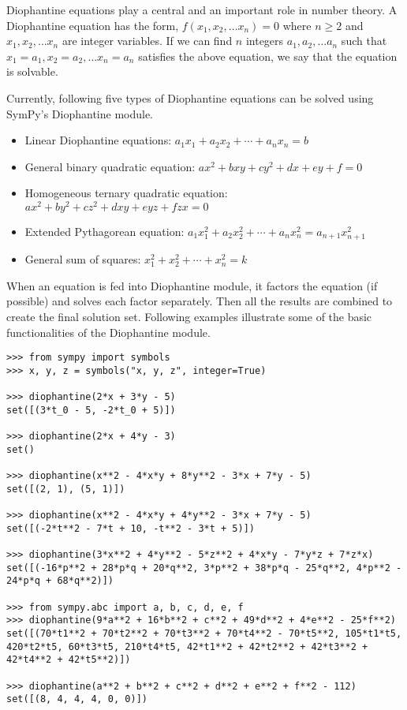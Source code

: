 Diophantine equations play a central and an important role in number theory.
A Diophantine equation has the form, $f(x_1, x_2, \ldots x_n) = 0$
where $n \geq 2$ and $x_1, x_2, \ldots x_n$ are integer variables. If we can find
$n$ integers $a_1, a_2, \ldots a_n$ such that $x_1 = a_1, x_2 = a_2, \ldots x_n = a_n$
satisfies the above equation, we say that the equation is solvable.

Currently, following five types of Diophantine equations can be solved using
SymPy's Diophantine module.

\begin{itemize}
    \item Linear Diophantine equations: $a_1x_1 + a_2x_2 + \cdots + a_{n}x_{n} = b$
    \item General binary quadratic equation: $ax^2 + bxy + cy^2 + dx + ey + f = 0$
    \item Homogeneous ternary quadratic equation: $ax^2 + by^2 + cz^2 + dxy + eyz + fzx = 0$
    \item Extended Pythagorean equation: $a_{1}x_{1}^2 + a_{2}x_{2}^2 + \cdots + a_{n}x_{n}^2 = a_{n+1}x_{n+1}^2$
    \item General sum of squares: $x_{1}^2 + x_{2}^2 + \cdots + x_{n}^2 = k$
\end{itemize}

When an equation is fed into Diophantine module, it factors the equation (if
possible) and solves each factor separately. Then all the results are combined to
create the final solution set. Following examples illustrate some of the basic
functionalities of the Diophantine module.

\begin{verbatim}
>>> from sympy import symbols
>>> x, y, z = symbols("x, y, z", integer=True)

>>> diophantine(2*x + 3*y - 5)
set([(3*t_0 - 5, -2*t_0 + 5)])

>>> diophantine(2*x + 4*y - 3)
set()

>>> diophantine(x**2 - 4*x*y + 8*y**2 - 3*x + 7*y - 5)
set([(2, 1), (5, 1)])

>>> diophantine(x**2 - 4*x*y + 4*y**2 - 3*x + 7*y - 5)
set([(-2*t**2 - 7*t + 10, -t**2 - 3*t + 5)])

>>> diophantine(3*x**2 + 4*y**2 - 5*z**2 + 4*x*y - 7*y*z + 7*z*x)
set([(-16*p**2 + 28*p*q + 20*q**2, 3*p**2 + 38*p*q - 25*q**2, 4*p**2 - 24*p*q + 68*q**2)])

>>> from sympy.abc import a, b, c, d, e, f
>>> diophantine(9*a**2 + 16*b**2 + c**2 + 49*d**2 + 4*e**2 - 25*f**2)
set([(70*t1**2 + 70*t2**2 + 70*t3**2 + 70*t4**2 - 70*t5**2, 105*t1*t5, 420*t2*t5, 60*t3*t5, 210*t4*t5, 42*t1**2 + 42*t2**2 + 42*t3**2 + 42*t4**2 + 42*t5**2)])

>>> diophantine(a**2 + b**2 + c**2 + d**2 + e**2 + f**2 - 112)
set([(8, 4, 4, 4, 0, 0)])
\end{verbatim}
